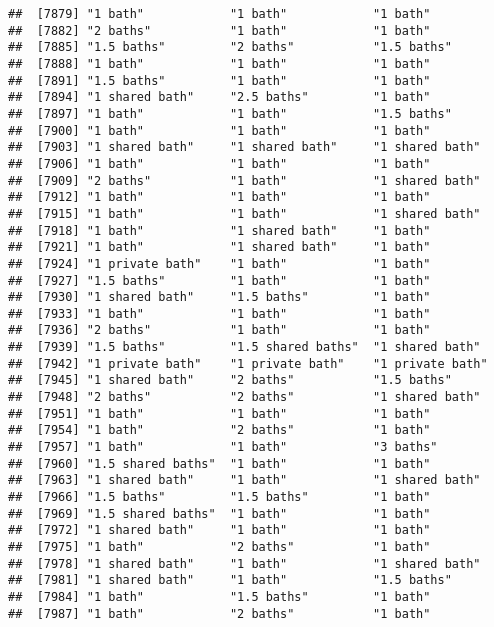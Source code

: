 \documentclass[
]{article}
\begin{document}
\begin{verbatim}
##  [7879] "1 bath"            "1 bath"            "1 bath"           
##  [7882] "2 baths"           "1 bath"            "1 bath"           
##  [7885] "1.5 baths"         "2 baths"           "1.5 baths"        
##  [7888] "1 bath"            "1 bath"            "1 bath"           
##  [7891] "1.5 baths"         "1 bath"            "1 bath"           
##  [7894] "1 shared bath"     "2.5 baths"         "1 bath"           
##  [7897] "1 bath"            "1 bath"            "1.5 baths"        
##  [7900] "1 bath"            "1 bath"            "1 bath"           
##  [7903] "1 shared bath"     "1 shared bath"     "1 shared bath"    
##  [7906] "1 bath"            "1 bath"            "1 bath"           
##  [7909] "2 baths"           "1 bath"            "1 shared bath"    
##  [7912] "1 bath"            "1 bath"            "1 bath"           
##  [7915] "1 bath"            "1 bath"            "1 shared bath"    
##  [7918] "1 bath"            "1 shared bath"     "1 bath"           
##  [7921] "1 bath"            "1 shared bath"     "1 bath"           
##  [7924] "1 private bath"    "1 bath"            "1 bath"           
##  [7927] "1.5 baths"         "1 bath"            "1 bath"           
##  [7930] "1 shared bath"     "1.5 baths"         "1 bath"           
##  [7933] "1 bath"            "1 bath"            "1 bath"           
##  [7936] "2 baths"           "1 bath"            "1 bath"           
##  [7939] "1.5 baths"         "1.5 shared baths"  "1 shared bath"    
##  [7942] "1 private bath"    "1 private bath"    "1 private bath"   
##  [7945] "1 shared bath"     "2 baths"           "1.5 baths"        
##  [7948] "2 baths"           "2 baths"           "1 shared bath"    
##  [7951] "1 bath"            "1 bath"            "1 bath"           
##  [7954] "1 bath"            "2 baths"           "1 bath"           
##  [7957] "1 bath"            "1 bath"            "3 baths"          
##  [7960] "1.5 shared baths"  "1 bath"            "1 bath"           
##  [7963] "1 shared bath"     "1 bath"            "1 shared bath"    
##  [7966] "1.5 baths"         "1.5 baths"         "1 bath"           
##  [7969] "1.5 shared baths"  "1 bath"            "1 bath"           
##  [7972] "1 shared bath"     "1 bath"            "1 bath"           
##  [7975] "1 bath"            "2 baths"           "1 bath"           
##  [7978] "1 shared bath"     "1 bath"            "1 shared bath"    
##  [7981] "1 shared bath"     "1 bath"            "1.5 baths"        
##  [7984] "1 bath"            "1.5 baths"         "1 bath"           
##  [7987] "1 bath"            "2 baths"           "1 bath"           

\end{verbatim}
\end{document}
